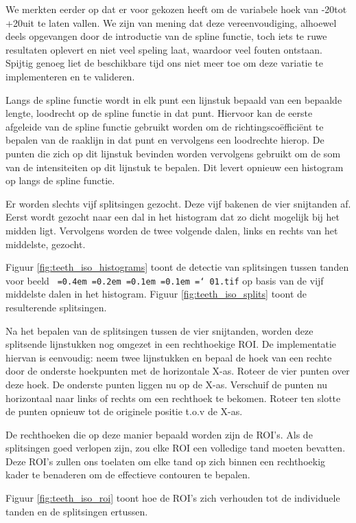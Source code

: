 \documentclass[10pt,a4paper]{article}
\newcommand*\justify{%
  \fontdimen2\font=0.4em%
  \fontdimen3\font=0.2em%
  \fontdimen4\font=0.1em%
  \fontdimen7\font=0.1em%
  \hyphenchar\font=`\-%
}
\newcommand{\ttt}[1]{{\tt \justify{#1}}}
\begin{document}
We merkten eerder op dat \cite{jain2004matching} er voor gekozen heeft om de variabele hoek van -20\degree tot +20\degree uit \cite{abdel2003challenges} te laten vallen. We zijn van mening dat deze vereenvoudiging, alhoewel deels opgevangen door de introductie van de spline functie, toch iets te ruwe resultaten oplevert en niet veel speling laat, waardoor veel fouten ontstaan. Spijtig genoeg liet de beschikbare tijd ons niet meer toe om deze variatie te implementeren en te valideren.

Langs de spline functie wordt in elk punt een lijnstuk bepaald van een bepaalde lengte, loodrecht op de spline functie in dat punt. Hiervoor kan de eerste afgeleide van de spline functie gebruikt worden om de richtingsco\"effici\"ent te bepalen van de raaklijn in dat punt en vervolgens een loodrechte hierop. De punten die zich op dit lijnstuk bevinden worden vervolgens gebruikt om de som van de intensiteiten op dit lijnstuk te bepalen. Dit levert opnieuw een histogram op langs de spline functie. 

Er worden slechts vijf splitsingen gezocht. Deze vijf bakenen de vier snijtanden af. Eerst wordt gezocht naar een dal in het histogram dat zo dicht mogelijk bij het midden ligt. Vervolgens worden de twee volgende dalen, links en rechts van het middelste, gezocht.

Figuur \ref{fig:teeth_iso_histograms} toont de detectie van splitsingen tussen tanden voor beeld \ttt{01.tif} op basis van de vijf middelste dalen in het histogram. Figuur \ref{fig:teeth_iso_splits} toont de resulterende splitsingen.

Na het bepalen van de splitsingen tussen de vier snijtanden, worden deze splitsende lijnstukken nog omgezet in een rechthoekige ROI. De implementatie hiervan is eenvoudig: neem twee lijnstukken en bepaal de hoek van een rechte door de onderste hoekpunten met de horizontale X-as. Roteer de vier punten over deze hoek. De onderste punten liggen nu op de X-as. Verschuif de punten nu horizontaal naar links of rechts om een rechthoek te bekomen. Roteer ten slotte de punten opnieuw tot de originele positie t.o.v de X-as.

De rechthoeken die op deze manier bepaald worden zijn de ROI's. Als de splitsingen goed verlopen zijn, zou elke ROI een volledige tand moeten bevatten. Deze ROI's zullen ons toelaten om elke tand op zich binnen een rechthoekig kader te benaderen om de effectieve contouren te bepalen.

Figuur \ref{fig:teeth_iso_roi} toont hoe de ROI's zich verhouden tot de individuele tanden en de splitsingen ertussen.
\end{document}
